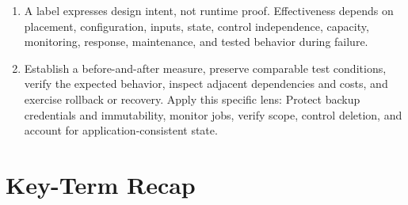 \documentclass[11pt]{article}
\begin{document}
\begin{enumerate}
\item A label expresses design intent, not runtime proof. Effectiveness depends on placement, configuration, inputs, state, control independence, capacity, monitoring, response, maintenance, and tested behavior during failure.
\item Establish a before-and-after measure, preserve comparable test conditions, verify the expected behavior, inspect adjacent dependencies and costs, and exercise rollback or recovery. Apply this specific lens: Protect backup credentials and immutability, monitor jobs, verify scope, control deletion, and account for application-consistent state.
\end{enumerate}
\section{Key-Term Recap}
\end{document}
